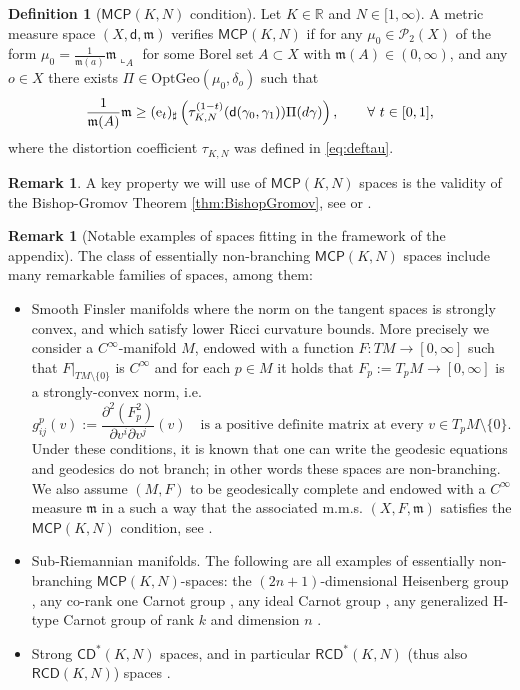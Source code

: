 \documentclass[a4paper]{amsart}
\newcounter{assu}
\theoremstyle{plain}
\theoremstyle{definition}
\newtheorem{definition}[lemma]{Definition}
\newtheorem{remark}[lemma]{Remark}
\numberwithin{equation}{section}
\newcommand{\R}{\mathbb{R}}
\newcommand{\RCD}{\mathsf{RCD}}
\newcommand{\CD}{\mathsf{CD}}
\newcommand{\MCP}{\mathsf{MCP}}
\newcommand{\mm}{\mathfrak m}
\newcommand{\sfd}{\mathsf d}
\newcommand{\cP}{\mathcal P}
\newcommand{\Opt}{\mathrm{OptGeo}}
\newcommand{\ee} {{\rm e}}
\begin{document}
{{\begin{definition}[$\MCP(K,N)$ condition]\label{def:MCP}
Let $K \in \R$ and $N \in [1,\infty)$. A metric measure space  $(X,\sfd,\mm)$ verifies $\MCP(K,N)$ if for any $\mu_{0} \in \cP_{2}(X)$ of the form 
$\mu_{0} = \frac{1}{\mm(a)} \mm\llcorner_{A}$ for some Borel set $A \subset X$ 
with $\mm(A) \in (0,\infty)$, and any $o \in X$ there exists $\Pi \in \Opt(\mu_{0},\delta_{o})$ such that 
%
\begin{equation}\label{eq:defMCP}
\frac{1}{\mm(A)} \mm 
 \geq  (\ee_{t})_{\sharp} \left( \tau_{K,N}^{(1-t)}(\sfd(\gamma_{0},\gamma_{1})) \Pi(d\gamma) \right), \qquad \forall \ t\in [0,1],
\end{equation}
where the  distortion coefficient $\tau_{K,N}$ was defined in \eqref{eq:deftau}.
%
\end{definition}

\begin{remark}\label{rem:BG}
A  key property we will use of  $\MCP(K,N)$ spaces is the validity of the Bishop-Gromov Theorem  \ref{thm:BishopGromov}, see \cite[Remark 5.3]{sturm:II} or \cite[Theorem 5.1]{ohtmea}.
\end{remark}


\begin{remark}[Notable examples of spaces fitting in the framework of the appendix]
The class of essentially non-branching $\MCP(K,N)$ spaces include many remarkable families of spaces, among them:
\begin{itemize}
\item  Smooth  Finsler manifolds where the norm on the tangent spaces is strongly convex, and which satisfy lower Ricci curvature bounds. More precisely we consider a $C^{\infty}$-manifold  $M$, endowed with a function $F:TM\to[0,\infty]$ such that $F|_{TM\setminus \{0\}}$ is $C^{\infty}$ and  for each $p \in M$ it holds that $F_p:=T_pM\to [0,\infty]$ is a  strongly-convex norm, i.e.
$$g^p_{ij}(v):=\frac{\partial^2 (F_p^2)}{\partial v^i \partial v^j}(v) \quad \text{is a positive definite matrix at every } v \in T_pM\setminus\{0\}. $$
Under these conditions, it is known that one can write the  geodesic equations and geodesics do not branch; in other words these spaces are non-branching. 
We also assume $(M,F)$ to be geodesically complete and endowed with a $C^{\infty}$  measure $\mm$ in a such a way that the associated m.m.s. $(X,F,\mm)$ satisfies the  $\MCP(K,N)$ condition,  see \cite{ohtafinsler1}. 
\item Sub-Riemannian manifolds. The following are all examples of essentially non-branching $\MCP(K,N)$-spaces:  the $(2n+1)$-dimensional Heisenberg group \cite{Juillet},  any co-rank one Carnot group \cite{Rizzi},   any ideal Carnot group \cite{Rifford}, any generalized H-type Carnot group of rank $k$ and dimension $n$ \cite{BarilariRizzi}.
\item Strong $\CD^{*}(K,N)$ spaces, and in particular $\RCD^{*}(K,N)$ (thus  also $\RCD(K,N)$) spaces  \cite{rajalasturm}. 
\end{itemize}
\end{remark}

}}
\end{document}

